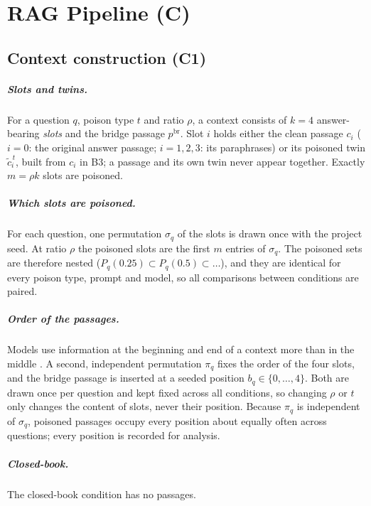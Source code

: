 \documentclass[11pt,a4paper]{report}
\begin{document}
\chapter{RAG Pipeline (C)}\label{ch:c}

\section{Context construction (C1)}\label{sec:c1-contexts}

\paragraph{Slots and twins.}
For a question $q$, poison type $t$ and ratio $\rho$, a context consists of
$k = 4$ answer-bearing \emph{slots} and the bridge passage $p^{\mathrm{br}}$.
Slot $i$ holds either the clean passage $c_i$ ($i = 0$: the original answer
passage; $i = 1,2,3$: its paraphrases) or its poisoned twin $\tilde{c}^{\,t}_i$,
built from $c_i$ in B3; a passage and its own twin never appear together.
Exactly $m = \rho k$ slots are poisoned.

\paragraph{Which slots are poisoned.}
For each question, one permutation $\sigma_q$ of the slots is drawn once with
the project seed. At ratio $\rho$ the poisoned slots are the first $m$ entries
of $\sigma_q$. The poisoned sets are therefore nested
($P_q(0.25) \subset P_q(0.5) \subset \dots$), and they are identical for every
poison type, prompt and model, so all comparisons between conditions are paired.

\paragraph{Order of the passages.}
Models use information at the beginning and end of a context more than in the
middle \citep{liu2024lost}. A second, independent permutation
$\pi_q$ fixes the order of the four slots, and the bridge passage is inserted at
a seeded position $b_q \in \{0,\dots,4\}$. Both are drawn once per question and
kept fixed across all conditions, so changing $\rho$ or $t$ only changes the
content of slots, never their position. Because $\pi_q$ is independent of
$\sigma_q$, poisoned passages occupy every position about equally often across
questions; every position is recorded for analysis.
\paragraph{Closed-book.}
The closed-book condition has no passages.
\end{document}

